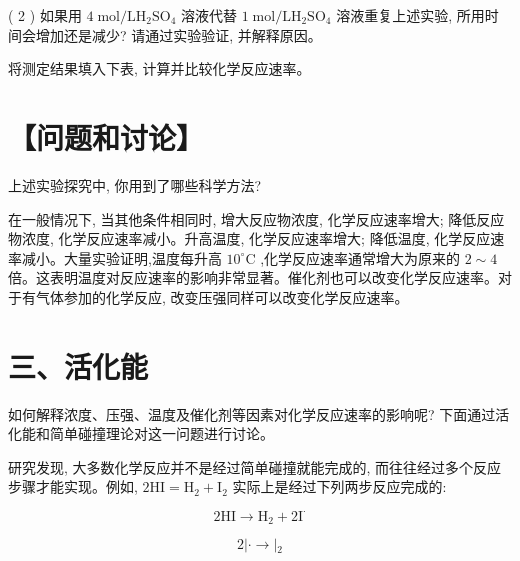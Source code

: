 \documentclass[10pt]{article}
\begin{document}
( 2 ) 如果用 \(4\mathrm{\;{mol}}/\mathrm{L}{\mathrm{H}}_{2}{\mathrm{{SO}}}_{4}\) 溶液代替 \(1\mathrm{\;{mol}}/\mathrm{L}{\mathrm{H}}_{2}{\mathrm{{SO}}}_{4}\) 溶液重复上述实验, 所用时间会增加还是减少? 请通过实验验证, 并解释原因。

将测定结果填入下表, 计算并比较化学反应速率。

\begin{center}
\end{center}

\section*{【问题和讨论】}

上述实验探究中, 你用到了哪些科学方法?

在一般情况下, 当其他条件相同时, 增大反应物浓度, 化学反应速率增大; 降低反应物浓度, 化学反应速率减小。升高温度, 化学反应速率增大; 降低温度, 化学反应速率减小。大量实验证明,温度每升高 \({10}^{ \circ }\mathrm{C}\) ,化学反应速率通常增大为原来的 \(2 \sim 4\) 倍。这表明温度对反应速率的影响非常显著。催化剂也可以改变化学反应速率。对于有气体参加的化学反应, 改变压强同样可以改变化学反应速率。

\section*{三、活化能}

如何解释浓度、压强、温度及催化剂等因素对化学反应速率的影响呢? 下面通过活化能和简单碰撞理论对这一问题进行讨论。

研究发现, 大多数化学反应并不是经过简单碰撞就能完成的, 而往往经过多个反应步骤才能实现。例如, \(2\mathrm{{HI}} = {\mathrm{H}}_{2} + {\mathrm{I}}_{2}\) 实际上是经过下列两步反应完成的:

\[
2\mathrm{{HI}} \rightarrow {\mathrm{H}}_{2} + 2{\mathrm{I}}^{ \cdot }
\]

\[
2\left| {\cdot \rightarrow }\right| {}_{2}
\]
\end{document}
